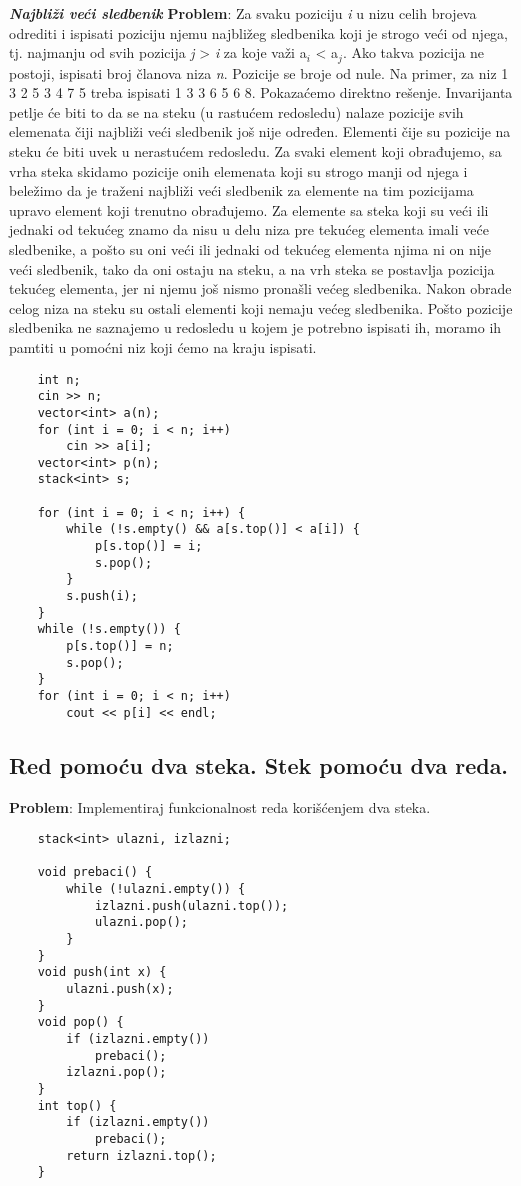 \documentclass{article}
\begin{document}
\vspace{0.2cm}
\textit{\textbf{Najbliži veći sledbenik}}
\newline \textbf{Problem}: Za svaku poziciju \textit{i} u nizu celih brojeva odrediti i ispisati poziciju
njemu najbližeg sledbenika koji je strogo veći od njega, tj. najmanju od svih
pozicija \textit{j} > \textit{i} za koje važi a$_i$ < a$_j$. Ako takva pozicija ne postoji, ispisati broj članova niza \textit{n}.
Pozicije se broje od nule. Na primer, za niz 1 3 2 5 3 4 7 5 treba ispisati 1 3 3 6 5 6 8.
\newline Pokazaćemo direktno rešenje. Invarijanta petlje će biti to da se na steku (u
rastućem redosledu) nalaze pozicije svih elemenata čiji najbliži veći sledbenik
još nije određen. Elementi čije su pozicije na steku će biti uvek u nerastućem redosledu. Za svaki
element koji obrađujemo, sa vrha steka skidamo pozicije onih elemenata koji
su strogo manji od njega i beležimo da je traženi najbliži veći sledbenik za
elemente na tim pozicijama upravo element koji trenutno obrađujemo. Za elemente sa steka koji su veći ili jednaki od tekućeg znamo da nisu u delu niza
pre tekućeg elementa imali veće sledbenike, a pošto su oni veći ili jednaki od
tekućeg elementa njima ni on nije veći sledbenik, tako da oni ostaju na steku,
a na vrh steka se postavlja pozicija tekućeg elementa, jer ni njemu još nismo
pronašli većeg sledbenika.
Nakon obrade celog niza na steku su ostali elementi koji nemaju većeg sledbenika.
Pošto pozicije sledbenika ne saznajemo u redosledu u kojem je potrebno ispisati
ih, moramo ih pamtiti u pomoćni niz koji ćemo na kraju ispisati.
\newpage
\begin{lstlisting}
    int n;
    cin >> n;
    vector<int> a(n);
    for (int i = 0; i < n; i++)
        cin >> a[i];
    vector<int> p(n);
    stack<int> s;
    
    for (int i = 0; i < n; i++) {
        while (!s.empty() && a[s.top()] < a[i]) {
            p[s.top()] = i;
            s.pop();
        }
        s.push(i);
    }
    while (!s.empty()) {
        p[s.top()] = n;
        s.pop();
    }
    for (int i = 0; i < n; i++)
        cout << p[i] << endl;
\end{lstlisting}

\subsection{Red pomoću dva steka. Stek pomoću dva reda.}
\textbf{Problem}: Implementiraj funkcionalnost reda korišćenjem dva steka.
\begin{lstlisting}
    stack<int> ulazni, izlazni;
   
    void prebaci() {
        while (!ulazni.empty()) {
            izlazni.push(ulazni.top());
            ulazni.pop();
        }
    }
    void push(int x) {
        ulazni.push(x);
    }
    void pop() {
        if (izlazni.empty())
            prebaci();
        izlazni.pop();
    }
    int top() {
        if (izlazni.empty())
            prebaci();
        return izlazni.top();
    }
\end{lstlisting}
\end{document}
